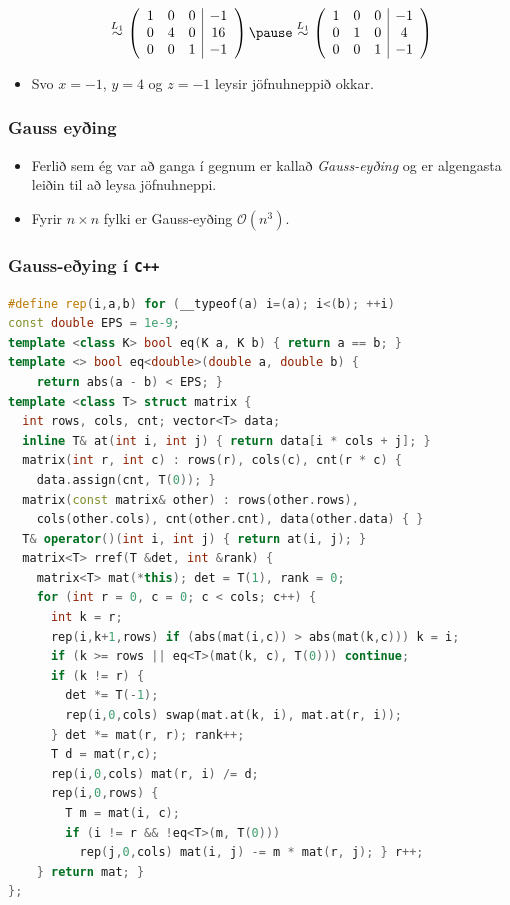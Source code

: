 \documentclass{beamer}
\renewcommand\O{\mathcal{O}}
\begin{document}
\begin{frame}
\begin{itemize}
\[				\stackrel{L_1}{\sim}
				\left (
				\begin{array}{c c c | c}
					1 & 0 & 0 & -1\\
					0 & 4 & 0 & 16\\
					0 & 0 & 1 & -1
				\end{array}
				\right )
				\pause
				\stackrel{L_1}{\sim}
				\left (
				\begin{array}{c c c | c}
					1 & 0 & 0 & -1\\
					0 & 1 & 0 & 4\\
					0 & 0 & 1 & -1
				\end{array}
				\right )
			\]
		\pause\item Svo $x = -1$, $y = 4$ og $z = -1$ leysir jöfnuhneppið okkar.
	\end{itemize}
\end{frame}

\begin{frame}
	\frametitle{Gauss eyðing}
	\begin{itemize}
		\item<1-> Ferlið sem ég var að ganga í gegnum er kallað \emph{Gauss-eyðing} og er algengasta leiðin til að leysa
			jöfnuhneppi.
		\item<2-> Fyrir $n \times n$ fylki er Gauss-eyðing $\O(n^3)$.
	\end{itemize}
\end{frame}

\begin{frame}[fragile]
	\frametitle{Gauss-eðying í \texttt{C++}}
	\tiny
\begin{lstlisting}[language=C++]
#define rep(i,a,b) for (__typeof(a) i=(a); i<(b); ++i)
const double EPS = 1e-9;
template <class K> bool eq(K a, K b) { return a == b; }
template <> bool eq<double>(double a, double b) {
    return abs(a - b) < EPS; }
template <class T> struct matrix {
  int rows, cols, cnt; vector<T> data;
  inline T& at(int i, int j) { return data[i * cols + j]; }
  matrix(int r, int c) : rows(r), cols(c), cnt(r * c) {
    data.assign(cnt, T(0)); }
  matrix(const matrix& other) : rows(other.rows),
    cols(other.cols), cnt(other.cnt), data(other.data) { }
  T& operator()(int i, int j) { return at(i, j); }
  matrix<T> rref(T &det, int &rank) {
    matrix<T> mat(*this); det = T(1), rank = 0;
    for (int r = 0, c = 0; c < cols; c++) {
      int k = r;
      rep(i,k+1,rows) if (abs(mat(i,c)) > abs(mat(k,c))) k = i;
      if (k >= rows || eq<T>(mat(k, c), T(0))) continue;
      if (k != r) {
        det *= T(-1);
        rep(i,0,cols) swap(mat.at(k, i), mat.at(r, i));
      } det *= mat(r, r); rank++;
      T d = mat(r,c);
      rep(i,0,cols) mat(r, i) /= d;
      rep(i,0,rows) {
        T m = mat(i, c);
        if (i != r && !eq<T>(m, T(0)))
          rep(j,0,cols) mat(i, j) -= m * mat(r, j); } r++;
    } return mat; }
};
\end{lstlisting}
\end{frame}
\end{document}

